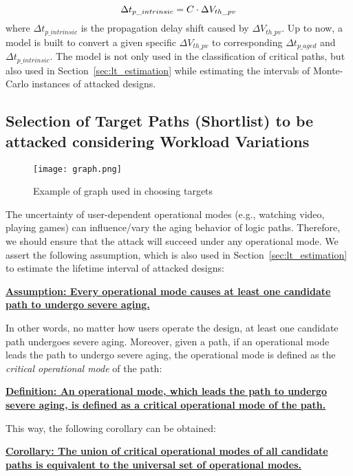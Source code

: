 \begin{equation}
	\centering
	\fontsize{9}{9} \selectfont
	\Delta t_{p\_intrinsic} = C \cdot \Delta V_{th\_pv}
	\label{eq:vtodelay2}
\end{equation}	
where $\Delta t_{p\_intrinsic}$ is the propagation delay shift caused by $\Delta V_{th\_pv}$. Up to now, a model is built to convert a given specific $\Delta V_{th\_pv}$ to corresponding $\Delta t_{p\_aged}$ and $\Delta t_{p\_intrinsic}$. The model is not only used in the classification of critical paths, but also used in Section~\ref{sec:lt_estimation} while estimating the intervals of Monte-Carlo instances of attacked designs. 
\subsection{Selection of Target Paths (Shortlist) to be attacked considering Workload Variations}
\label{sec:frame:workload}
\begin{figure}
	\centering
	\texttt{[image: graph.png]}
	\caption{Example of graph used in choosing targets}
	\label{fig:graph}
\end{figure}

The uncertainty of user-dependent operational modes (e.g., watching video, playing games) can influence/vary the aging behavior of logic paths. Therefore, we should ensure that the attack will succeed under any operational mode. We assert the following assumption, which is also used in Section~\ref{sec:lt_estimation} to estimate the lifetime interval of attacked designs:

\noindent \textbf{\uline{Assumption: Every operational mode causes at least one candidate path to undergo severe aging.}}

In other words, no matter how users operate the design, at least one candidate path undergoes severe aging. Moreover, given a path, if an operational mode leads the path to undergo severe aging, the operational mode is defined as the \textit{critical operational mode} of the path:

\noindent \textbf{\uline{Definition: An operational mode, which leads the path to undergo severe aging, is defined as a critical operational mode of the path.}}

This way, the following corollary can be obtained:

\noindent \textbf{\uline{Corollary: The union of critical operational modes of all candidate paths is equivalent to the universal set of operational modes.}}

